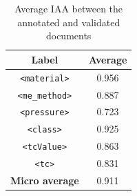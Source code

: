 \documentclass[fleqn,10pt]{wlscirep}
\begin{document}

\begin{table}[ht]
    \centering
    \begin{tabular}{ | c | c | } 
    \hline
        \textbf{Label} & \textbf{Average}\\
    \hline
        \texttt{<material>}     &   0.956   \\
        \texttt{<me\_method>}   &	0.887   \\
        \texttt{<pressure>}     &	0.723   \\
        \texttt{<class>}        &	0.925   \\
        \texttt{<tcValue>}      &	0.863   \\
        \texttt{<tc>}           &	0.831   \\
    \hline
        \textbf{Micro average}        &	0.911	\\
    \hline
    \end{tabular}
    \caption{Average IAA between the annotated and validated documents}
    \label{table:average-iaa}
\end{table}
\end{document}
